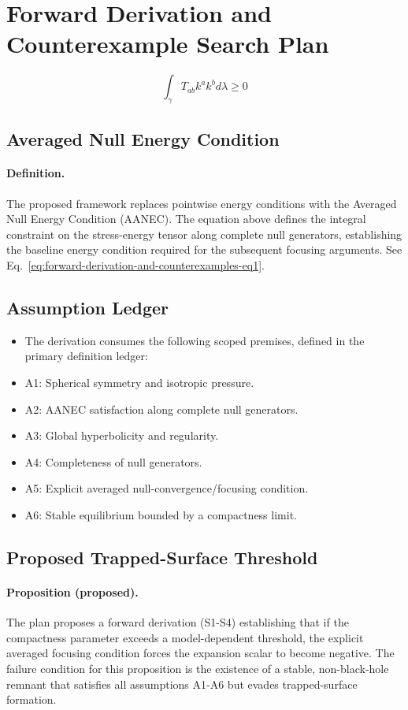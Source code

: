 \documentclass[conference]{IEEEtran}
\begin{document}
\section{Forward Derivation and Counterexample Search Plan}
\begin{equation}
\int_{\gamma} T_{ab} k^a k^b d\lambda \geq 0
\label{eq:forward-derivation-and-counterexamples-eq1}
\end{equation}

\subsection{Averaged Null Energy Condition}
\paragraph{Definition.} The proposed framework replaces pointwise energy conditions with the Averaged Null Energy Condition (AANEC). The equation above defines the integral constraint on the stress-energy tensor along complete null generators, establishing the baseline energy condition required for the subsequent focusing arguments. See Eq.~\eqref{eq:forward-derivation-and-counterexamples-eq1}.

\subsection{Assumption Ledger}
\begin{itemize}
\item The derivation consumes the following scoped premises, defined in the primary definition ledger:
\item A1: Spherical symmetry and isotropic pressure.
\item A2: AANEC satisfaction along complete null generators.
\item A3: Global hyperbolicity and regularity.
\item A4: Completeness of null generators.
\item A5: Explicit averaged null-convergence/focusing condition.
\item A6: Stable equilibrium bounded by a compactness limit.
\end{itemize}

\subsection{Proposed Trapped-Surface Threshold}
\paragraph{Proposition (proposed).} The plan proposes a forward derivation (S1-S4) establishing that if the compactness parameter exceeds a model-dependent threshold, the explicit averaged focusing condition forces the expansion scalar to become negative. The failure condition for this proposition is the existence of a stable, non-black-hole remnant that satisfies all assumptions A1-A6 but evades trapped-surface formation.
\end{document}
